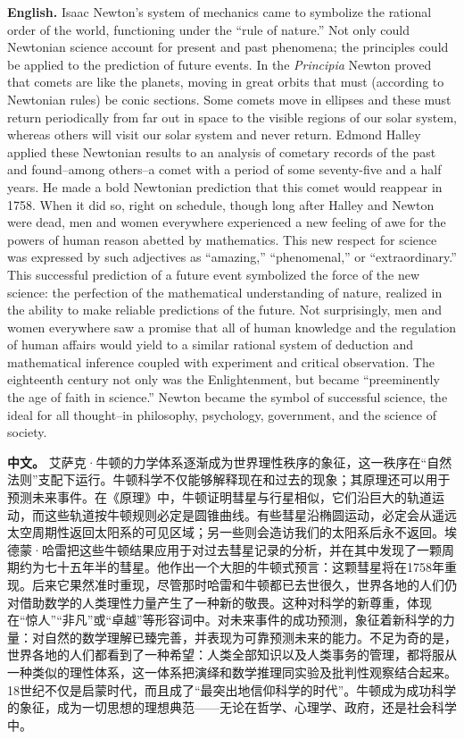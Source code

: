 \noindent\textbf{English.} Isaac Newton's system of mechanics came to symbolize the rational order of the world, functioning under the ``rule of nature.'' Not only could Newtonian science account for present and past phenomena; the principles could be applied to the prediction of future events. In the \emph{Principia} Newton proved that comets are like the planets, moving in great orbits that must (according to Newtonian rules) be conic sections. Some comets move in ellipses and these must return periodically from far out in space to the visible regions of our solar system, whereas others will visit our solar system and never return. Edmond Halley applied these Newtonian results to an analysis of cometary records of the past and found--among others--a comet with a period of some seventy-five and a half years. He made a bold Newtonian prediction that this comet would reappear in 1758. When it did so, right on schedule, though long after Halley and Newton were dead, men and women everywhere experienced a new feeling of awe for the powers of human reason abetted by mathematics. This new respect for science was expressed by such adjectives as ``amazing,'' ``phenomenal,'' or ``extraordinary.'' This successful prediction of a future event symbolized the force of the new science: the perfection of the mathematical understanding of nature, realized in the ability to make reliable predictions of the future. Not surprisingly, men and women everywhere saw a promise that all of human knowledge and the regulation of human affairs would yield to a similar rational system of deduction and mathematical inference coupled with experiment and critical observation. The eighteenth century not only was the Enlightenment, but became ``preeminently the age of faith in science.'' Newton became the symbol of successful science, the ideal for all thought--in philosophy, psychology, government, and the science of society.
\par\noindent\textbf{中文。} 艾萨克·牛顿的力学体系逐渐成为世界理性秩序的象征，这一秩序在“自然法则”支配下运行。牛顿科学不仅能够解释现在和过去的现象；其原理还可以用于预测未来事件。在《原理》中，牛顿证明彗星与行星相似，它们沿巨大的轨道运动，而这些轨道按牛顿规则必定是圆锥曲线。有些彗星沿椭圆运动，必定会从遥远太空周期性返回太阳系的可见区域；另一些则会造访我们的太阳系后永不返回。埃德蒙·哈雷把这些牛顿结果应用于对过去彗星记录的分析，并在其中发现了一颗周期约为七十五年半的彗星。他作出一个大胆的牛顿式预言：这颗彗星将在1758年重现。后来它果然准时重现，尽管那时哈雷和牛顿都已去世很久，世界各地的人们仍对借助数学的人类理性力量产生了一种新的敬畏。这种对科学的新尊重，体现在“惊人”“非凡”或“卓越”等形容词中。对未来事件的成功预测，象征着新科学的力量：对自然的数学理解已臻完善，并表现为可靠预测未来的能力。不足为奇的是，世界各地的人们都看到了一种希望：人类全部知识以及人类事务的管理，都将服从一种类似的理性体系，这一体系把演绎和数学推理同实验及批判性观察结合起来。18世纪不仅是启蒙时代，而且成了“最突出地信仰科学的时代”。牛顿成为成功科学的象征，成为一切思想的理想典范——无论在哲学、心理学、政府，还是社会科学中。
\medskip


